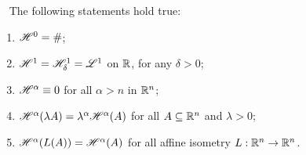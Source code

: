 \begin{theorem}~
The following statements hold true:
\begin{enumerate}[(1)]
\item $\mathscr{H}^{0} = \#$; 
\item $\mathscr{H}^{1} = \mathscr{H}^{1}_{\delta} = \mathscr{L}^{1}$ on $\mathbb{R}$, for any $\delta > 0$; 
\item $\mathscr{H}^{\alpha} \equiv 0$ for all $\alpha > n$ in $\mathbb{R}^n$;
\item $\mathscr{H}^{\alpha}(\lambda A) = \lambda^\alpha \mathscr{H}^{\alpha}(A)$ for all $A \subseteq \mathbb{R}^n$ and $\lambda > 0$;
\item $\mathscr{H}^{\alpha}(L(A)) = \mathscr{H}^{\alpha}(A)$ for all affine
isometry $L : \mathbb{R}^n \to \mathbb{R}^n$.
\end{enumerate}
\end{theorem}

